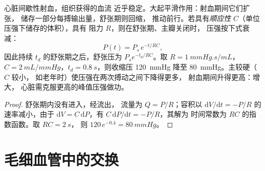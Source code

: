 \begin{theorem}[作为储库的弹性动脉]\label{thm:b2:blood-circulation:windkessel}
心脏间歇性射血，组织获得的血流
近乎稳定。大起平滑作用：射血期间它们扩张，
储存一部分每搏输出量，舒张期则回缩，
推动前行。若具有\emph{顺应性}
$C$（单位压强下储存的体积），具有
阻力 $R$，则在舒张期、主瓣关闭时，
压强按下式衰减：
\[
P(t) = P_{s}\,e^{-t/RC},
\]
因此持续 $t_d$ 的舒张期之后，舒张压为
$P_s e^{-t_d/RC}$。取 $R = \qty{1}{mmHg.s/mL}$，$C =
\qty{2}{mL/mmHg}$，$t_d = \qty{0.8}{s}$，则收缩压
\qty{120}{mmHg} 降至 \qty{80}{mmHg}。主较硬（$C$ 较小，
如老年时）使压强在两次搏动之间下降得更多，
射血期间升得更高：\emph{}增大，
心脏需克服更高的峰值压强做功。
\end{theorem}
\begin{proof}
舒张期内没有进入，经流出，
流量为 $Q = P/R$；容积以
$\mathrm{d}V/\mathrm{d}t = -P/R$ 的速率减小，由于 $\mathrm{d}V = C\,
\mathrm{d}P$，有 $C\,\mathrm{d}P/\mathrm{d}t = -P/R$，其解为
时间常数为 $RC$ 的指数函数。取 $RC = \qty{2}{s}$，
则 $120\,e^{-0.4} = \qty{80}{mmHg}$。
\end{proof}

\section{毛细血管中的交换}


